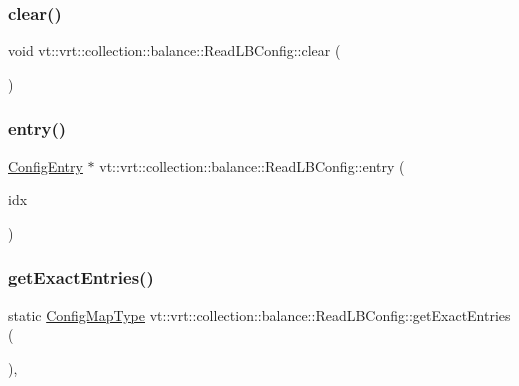 \subsubsection{\texorpdfstring{clear()}{clear()}}
{\footnotesize\ttfamily void vt\+::vrt\+::collection\+::balance\+::\+Read\+L\+B\+Config\+::clear (\begin{DoxyParamCaption}{ }\end{DoxyParamCaption})\hspace{0.3cm}{\ttfamily [static]}}

\mbox{\label{structvt_1_1vrt_1_1collection_1_1balance_1_1_read_l_b_config_a2811ea4fc680cc4dfe94d8c9160f7514}} 
\subsubsection{\texorpdfstring{entry()}{entry()}}
{\footnotesize\ttfamily \hyperlink{structvt_1_1vrt_1_1collection_1_1balance_1_1_config_entry}{Config\+Entry} $\ast$ vt\+::vrt\+::collection\+::balance\+::\+Read\+L\+B\+Config\+::entry (\begin{DoxyParamCaption}\item[{\hyperlink{namespacevt_1_1vrt_1_1collection_1_1balance_ac1bb9eee8129549177880dbb4e5f6a34}{Config\+Index} const \&}]{idx }\end{DoxyParamCaption})\hspace{0.3cm}{\ttfamily [static]}}

\mbox{\label{structvt_1_1vrt_1_1collection_1_1balance_1_1_read_l_b_config_a5e32057d53bfad17ba659a57b810c559}} 
\subsubsection{\texorpdfstring{get\+Exact\+Entries()}{getExactEntries()}}
{\footnotesize\ttfamily static \hyperlink{structvt_1_1vrt_1_1collection_1_1balance_1_1_read_l_b_config_ad7babe539cf2171b9a9cee642b36a965}{Config\+Map\+Type} vt\+::vrt\+::collection\+::balance\+::\+Read\+L\+B\+Config\+::get\+Exact\+Entries (\begin{DoxyParamCaption}{ }\end{DoxyParamCaption})\hspace{0.3cm}{\ttfamily [inline]}, {\ttfamily [static]}}

